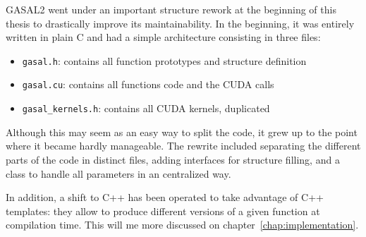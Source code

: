 GASAL2 went under an important structure rework at the beginning of this thesis to drastically improve its maintainability. In the beginning, it was entirely written in plain C and had a simple architecture consisting in three files:

\begin{itemize}
	\item \verb|gasal.h|: contains all function prototypes and structure definition
	\item \verb|gasal.cu|: contains all functions code and the CUDA calls
	\item \verb|gasal_kernels.h|: contains all CUDA kernels, duplicated
\end{itemize}

Although this may seem as an easy way to split the code, it grew up to the point where it became hardly manageable. The rewrite included separating the different parts of the code in distinct files, adding interfaces for structure filling, and a class to  handle all parameters in an centralized way.

In addition, a shift to C++ has been operated to take advantage of C++ templates: they allow to produce different versions of a given function at compilation time. This will me more discussed on chapter~\ref{chap:implementation}.




